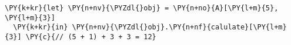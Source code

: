 \begin{Verbatim}[commandchars=\\\{\}]
\PY{k+kr}{let} \PY{n+nv}{\PYZdl{}obj} = \PY{n+no}{A}[\PY{l+m}{5}, \PY{l+m}{3}]
  \PY{k+kr}{in} \PY{n+nv}{\PYZdl{}obj}.\PY{n+nf}{calulate}[\PY{l+m}{3}] \PY{c}{// (5 + 1) + 3 + 3 = 12}
\end{Verbatim}
